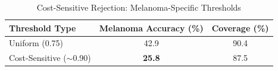 \begin{table}[h]
\centering
\caption{Cost-Sensitive Rejection: Melanoma-Specific Thresholds}
\begin{tabular}{lcc}
\toprule
Threshold Type & Melanoma Accuracy (\%) & Coverage (\%) \\
\midrule
Uniform (0.75) & 42.9 & 90.4 \\
Cost-Sensitive ($\sim$0.90) & \textbf{25.8} & 87.5 \\
\bottomrule
\end{tabular}
\label{tab:cost_sensitive}
\end{table}
